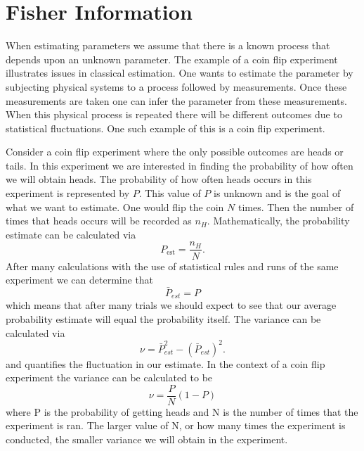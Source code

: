 \documentclass[twocolumn]{article}
\begin{document}
\section*{Fisher Information}
When estimating parameters we assume that there is a known process that depends upon an
 unknown parameter. The example of a coin flip experiment illustrates issues in classical estimation. One wants to estimate the parameter by subjecting physical systems to a process followed by measurements. Once these measurements are taken one can infer the parameter from these measurements. When this physical process is repeated there will be different outcomes due to statistical fluctuations. One such example of this is a coin flip experiment.

Consider a coin flip experiment where the only possible outcomes are heads or tails. In this experiment we are interested in finding the probability of how often we will obtain heads. The probability of how often heads occurs in this experiment is represented by $P$. This value of $P$ is unknown and is the goal of what we want to estimate. One would flip the coin $N$ times. Then the number of times that heads occurs will be recorded as $n_H$. Mathematically, the probability estimate can be calculated via
\begin{equation}\label{Eq: PE}
P_{\text{est}}=\frac{n_H}{N}.
\end{equation}
After many calculations with the use of statistical rules and runs of the same experiment we can determine that
\begin{equation} \label{Eq: PES}
\bar{P}_{est}=P
\end{equation}
which means that after many trials we should expect to see that our average probability estimate will equal the probability itself. The variance can be calculated via
\begin{equation} \label{Eq: V}
\nu=\bar{P}^2_{est}-(\bar{P}_{est})^2.
\end{equation}
and quantifies the fluctuation in our estimate. In the context of a coin flip experiment the variance can be calculated to be
\begin{equation} \label{Eq: CFP}
\nu=\frac{P}{N}(1-P)
\end{equation}
where P is the probability of getting heads and N is the number of times that the experiment is ran. The larger value of N, or how many times the experiment is conducted, the smaller variance we will obtain in the experiment. 
\end{document}
